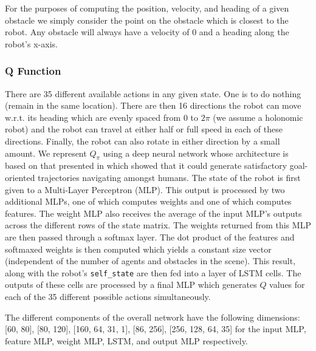 \documentclass[letterpaper]{article}
\begin{document}
				For the purposes of computing the position, velocity, and heading of a given obstacle we simply consider the point on the obstacle which is closest to the robot. Any obstacle will always have a velocity of 0 and a heading along the robot's x-axis.
				\subsubsection{Q Function}
				There are 35 different available actions in any given state. One is to do nothing (remain in the same location). There are then 16 directions the robot can move w.r.t. its heading which are evenly spaced from $0$ to $2\pi$ (we assume a holonomic robot) and the robot can travel at either half or full speed in each of these directions. Finally, the robot can also rotate in either direction by a small amount. We represent $Q_\pi$ using a deep neural network whose architecture is based on that presented in \cite{crowdawarerl} which showed that it could generate satisfactory goal-oriented trajectories navigating amongst humans. The state of the robot is first given to a Multi-Layer Perceptron (MLP). This output is processed by two additional MLPs, one of which computes weights and one of which computes features. The weight MLP also receives the average of the input MLP's outputs across the different rows of the state matrix. The weights returned from this MLP are then passed through a softmax layer. The dot product of the features and softmaxed weights is then computed which yields a constant size vector (independent of the number of agents and obstacles in the scene). This result, along with the robot's \verb|self_state| are then fed into a layer of LSTM cells. The outputs of these cells are processed by a final MLP which generates $Q$ values for each of the 35 different possible actions simultaneously. 
				
				The different components of the overall network have the following dimensions: [60, 80], [80, 120], [160, 64, 31, 1], [86, 256], [256, 128, 64, 35] for the input MLP, feature MLP, weight MLP, LSTM, and output MLP respectively. 
				
\end{document}
